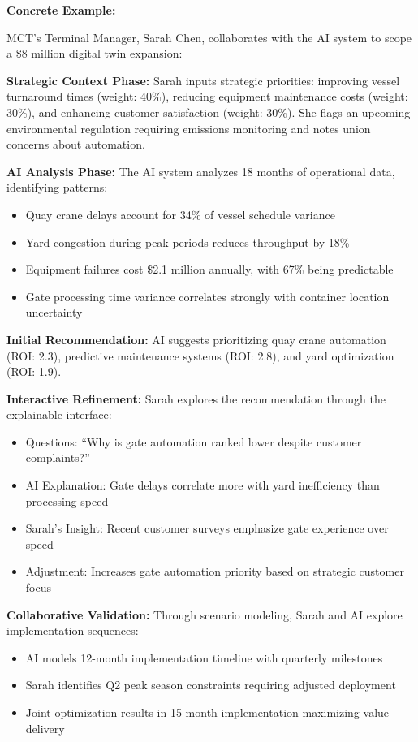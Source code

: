 \documentclass{article}
\begin{document}
\textbf{Concrete Example:}

MCT's Terminal Manager, Sarah Chen, collaborates with the AI system to scope a \$8 million digital twin expansion:

\textbf{Strategic Context Phase:} Sarah inputs strategic priorities: improving vessel turnaround times (weight: 40\%), reducing equipment maintenance costs (weight: 30\%), and enhancing customer satisfaction (weight: 30\%). She flags an upcoming environmental regulation requiring emissions monitoring and notes union concerns about automation.

\textbf{AI Analysis Phase:} The AI system analyzes 18 months of operational data, identifying patterns:
\begin{itemize}
\item Quay crane delays account for 34\% of vessel schedule variance
\item Yard congestion during peak periods reduces throughput by 18\%
\item Equipment failures cost \$2.1 million annually, with 67\% being predictable
\item Gate processing time variance correlates strongly with container location uncertainty
\end{itemize}

\textbf{Initial Recommendation:} AI suggests prioritizing quay crane automation (ROI: 2.3), predictive maintenance systems (ROI: 2.8), and yard optimization (ROI: 1.9).

\textbf{Interactive Refinement:} Sarah explores the recommendation through the explainable interface:
\begin{itemize}
\item Questions: ``Why is gate automation ranked lower despite customer complaints?''
\item AI Explanation: Gate delays correlate more with yard inefficiency than processing speed
\item Sarah's Insight: Recent customer surveys emphasize gate experience over speed
\item Adjustment: Increases gate automation priority based on strategic customer focus
\end{itemize}

\textbf{Collaborative Validation:} Through scenario modeling, Sarah and AI explore implementation sequences:
\begin{itemize}
\item AI models 12-month implementation timeline with quarterly milestones
\item Sarah identifies Q2 peak season constraints requiring adjusted deployment
\item Joint optimization results in 15-month implementation maximizing value delivery
\end{itemize}
\end{document}
